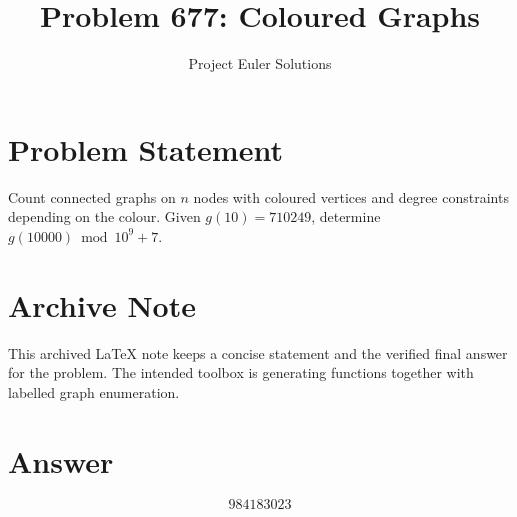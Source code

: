 \documentclass[11pt]{article}
\title{Problem 677: Coloured Graphs}
\author{Project Euler Solutions}
\date{}
\begin{document}
\maketitle

\section{Problem Statement}
Count connected graphs on $n$ nodes with coloured vertices and degree constraints depending on the colour. Given $g(10)=710249$, determine $g(10000) \bmod 10^9+7$.

\section{Archive Note}
This archived LaTeX note keeps a concise statement and the verified final answer for the problem. The intended toolbox is generating functions together with labelled graph enumeration.

\section{Answer}

\[
\boxed{984183023}
\]
\end{document}
